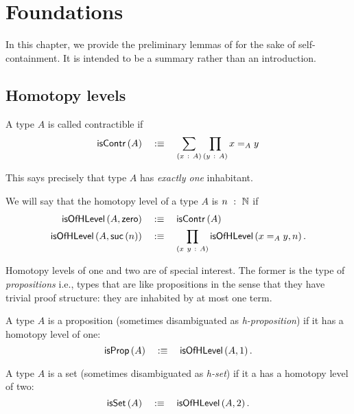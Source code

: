 \chapter{Foundations}\label{chap:foundations}

In this chapter, we provide the preliminary lemmas of \UF{} for the sake of
self-containment. It is intended to be a summary rather than an introduction.

\section{Homotopy levels}

\begin{defn}[Contractible]
  A type $A$ is called contractible if
  \begin{equation*}
    \mathsf{isContr}\left(A\right) \quad:\equiv\quad \sum_{(x~:~A)} \prod_{(y~:~A)} x =_A y
  \end{equation*}
\end{defn}

This says precisely that type $A$ has \emph{exactly one} inhabitant.

\begin{defn}
  We will say that the homotopy level of a type $A$ is $n~:~\mathbb{N}$ if
  \begin{align*}
    \mathsf{isOfHLevel}\left(A, \mathsf{zero}{}\right) &\quad:\equiv\quad \mathsf{isContr}\left(A\right)\\
    \mathsf{isOfHLevel}\left(A, \mathsf{suc}\left(n\right)\right) &\quad:\equiv\quad \prod_{(x~y~:~A)} \mathsf{isOfHLevel}\left(x =_A y, n\right).
  \end{align*}
\end{defn}

Homotopy levels of one and two are of special interest. The former is the type of
\emph{propositions} i.e., types that are like propositions in the sense that they have
trivial proof structure: they are inhabited by at most one term.

\begin{defn}[Proposition]
  A type $A$ is a proposition (sometimes disambiguated as \emph{h-proposition}) if it has
  a homotopy level of one:
  \begin{equation*}
    \mathsf{isProp}\left(A\right) \quad:\equiv\quad \mathsf{isOfHLevel}\left(A, 1\right).
  \end{equation*}
\end{defn}

\begin{defn}
  A type $A$ is a set (sometimes disambiguated as \emph{h-set}) if it a has a homotopy
  level of two:
  \begin{equation*}
    \mathsf{isSet}\left(A\right) \quad:\equiv\quad \mathsf{isOfHLevel}\left(A, 2\right).
  \end{equation*}
\end{defn}

